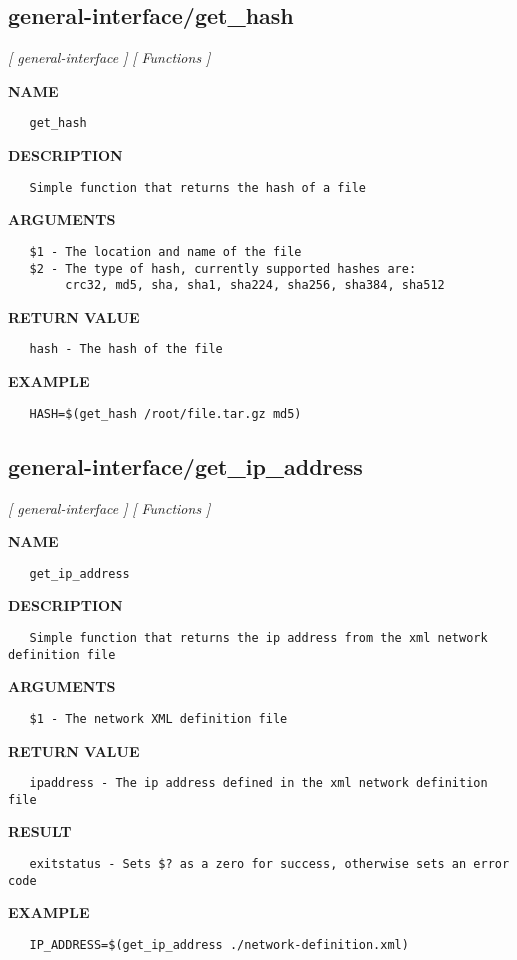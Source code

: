 \subsection{general-interface/get\_hash}
\textsl{[ general-interface ]}
\textsl{[ Functions ]}

\label{ch:robo24}
\label{ch:general_interface_get_hash}
\textbf{NAME}
\begin{verbatim}
   get_hash
\end{verbatim}
\textbf{DESCRIPTION}
\begin{verbatim}
   Simple function that returns the hash of a file
\end{verbatim}
\textbf{ARGUMENTS}
\begin{verbatim}
   $1 - The location and name of the file
   $2 - The type of hash, currently supported hashes are: 
        crc32, md5, sha, sha1, sha224, sha256, sha384, sha512
\end{verbatim}
\textbf{RETURN VALUE}
\begin{verbatim}
   hash - The hash of the file
\end{verbatim}
\textbf{EXAMPLE}
\begin{verbatim}
   HASH=$(get_hash /root/file.tar.gz md5)
\end{verbatim}
\newpage
\subsection{general-interface/get\_ip\_address}
\textsl{[ general-interface ]}
\textsl{[ Functions ]}

\label{ch:robo25}
\label{ch:general_interface_get_ip_address}
\textbf{NAME}
\begin{verbatim}
   get_ip_address
\end{verbatim}
\textbf{DESCRIPTION}
\begin{verbatim}
   Simple function that returns the ip address from the xml network definition file
\end{verbatim}
\textbf{ARGUMENTS}
\begin{verbatim}
   $1 - The network XML definition file
\end{verbatim}
\textbf{RETURN VALUE}
\begin{verbatim}
   ipaddress - The ip address defined in the xml network definition file
\end{verbatim}
\textbf{RESULT}
\begin{verbatim}
   exitstatus - Sets $? as a zero for success, otherwise sets an error code
\end{verbatim}
\textbf{EXAMPLE}
\begin{verbatim}
   IP_ADDRESS=$(get_ip_address ./network-definition.xml)
\end{verbatim}
\newpage

